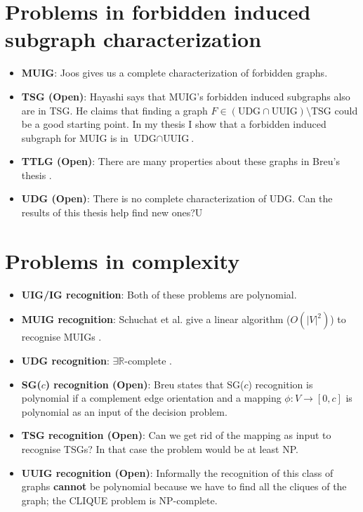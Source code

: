 \begin{appendices}
\chapter{Problems in forbidden induced subgraph characterization}
  \begin{itemize}
    \item \textbf{MUIG}: Joos \cite{joosCharacterizationMixedUnit2013} gives us a complete characterization of forbidden graphs.
    \item \textbf{TSG (Open)}: Hayashi \cite{hayashiThinStripGraphs2017} says that MUIG's forbidden induced subgraphs also are in TSG. He claims that finding a graph $F \in (\text{UDG}\cap\text{UUIG}) \setminus \text{TSG}$ could be a good starting point. In my thesis I show that a forbidden induced subgraph for MUIG is in $\text{UDG}\cap\text{UUIG}$.
    \item \textbf{TTLG (Open)}: There are many properties about these graphs in Breu's thesis \cite{breuAlgorithmicAspectsConstrained1996}.
    \item \textbf{UDG (Open)}: There is no complete characterization of UDG. Can the results of this thesis help find new ones?U
  \end{itemize}

  \chapter{Problems in complexity}
    \begin{itemize}
      \item \textbf{UIG/IG recognition}: Both of these problems are polynomial.
      \item \textbf{MUIG recognition}: Schuchat et al. give a linear algorithm ($O(|V|^2)$) to recognise MUIGs \cite{shuchatUnitMixedInterval2014}.
      \item \textbf{UDG recognition}: $\exists\mathbb{R}$-complete \cite{ExistentialTheoryReals2006}.
      \item \textbf{SG($c$) recognition (Open)}: Breu  \cite{breuAlgorithmicAspectsConstrained1996} states that SG($c$) recognition is polynomial if a complement edge orientation and a mapping $\phi : V \to [0,c]$ is polynomial as an input of the decision problem.
      \item \textbf{TSG recognition (Open)}: Can we get rid of the mapping as input to recognise TSGs? In that case the problem would be at least NP.
      \item \textbf{UUIG recognition (Open)}: Informally the recognition of this class of graphs \textbf{cannot} be polynomial because we have to find all the cliques of the graph; the CLIQUE problem is NP-complete.
    \end{itemize}

\end{appendices}

